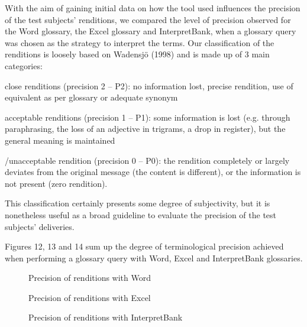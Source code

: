 \documentclass[output=paper]{langsci/langscibook}
\begin{document}
With the aim of gaining initial data on how the tool used influences the precision of the test subjects’ renditions, we compared the level of precision observed for the Word glossary, the Excel glossary and InterpretBank, when a glossary query was chosen as the strategy to interpret the terms. Our classification of the renditions is loosely based on Wadensjö (1998) and is made up of 3 main categories:

\begin{stylelsBulletList}
close renditions (precision 2 – P2): no information lost, precise rendition, use of equivalent as per glossary or adequate synonym
\end{stylelsBulletList}

\begin{stylelsBulletList}
acceptable renditions (precision 1 – P1): some information is lost (e.g. through paraphrasing, the loss of an adjective in trigrams, a drop in register), but the general meaning is maintained
\end{stylelsBulletList}

\begin{stylelsBulletList}\zero/unacceptable rendition (precision 0 – P0): the rendition completely or largely deviates from the original message (the content is different), or the information is not present (zero rendition).
\end{stylelsBulletList}

This classification certainly presents some degree of subjectivity, but it is nonetheless useful as a broad guideline to evaluate the precision of the test subjects’ deliveries.

Figures 12, 13 and 14 sum up the degree of terminological precision achieved when performing a glossary query with Word, Excel and InterpretBank glossaries. 

\begin{stylecaption}\begin{figure}
\caption{Precision of renditions with Word}
\label{fig:key:12}
\end{figure}\end{stylecaption}

\begin{stylecaption}\begin{figure}
\caption{Precision of renditions with Excel}
\label{fig:key:13}
\end{figure}\end{stylecaption}

\begin{stylecaption}\begin{figure}
\caption{Precision of renditions with InterpretBank}
\label{fig:key:14}
\end{figure}\end{stylecaption}
\end{document}
